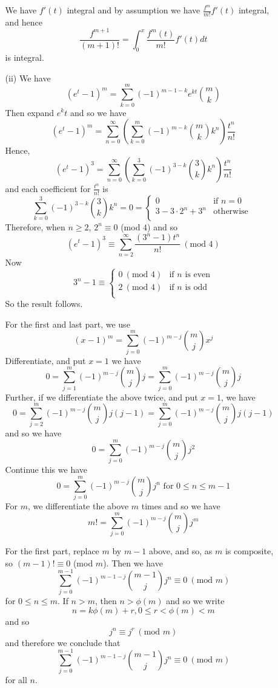 \begin{enumerate}
\begin{enumerate}
      We have $f'(t)$ integral and by assumption we have $\frac{f^m}{m!} f'(t)$ integral, and hence
      $$\frac{f^{m+1}}{(m+1)!}=\int_0^x \frac{f^{m}(t)}{m!}f'(t) dt$$ is integral.
      \item[(ii)] We have
      $$(e^t-1)^{m}=\sum_{k=0}^{m}(-1)^{m-1-k}e^{kt}\binom{m}{k}$$
      Then expand $e^kt$ and so we have
      $$(e^t-1)^{m}=\sum_{n=0}^\infty \left(\sum_{k=0}^{m} (-1)^{m-k}\binom{m}{k}k^n\right)\frac{t^n}{n!}$$
      Hence,
      $$(e^t-1)^3=\sum_{n=0}^\infty \left(\sum_{k=0}^3 (-1)^{3-k}\binom{3}{k}{k^n}\right)\frac{t^n}{n!}$$
      and each coefficient for $\frac{t^n}{n!}$ is
      \begin{equation*}
\sum_{k=0}^3 (-1)^{3-k}\binom{3}{k}{k^n}=0= \left\{
\begin{array}{ll}
0 & \text{if } n=0\\
3-3\cdot 2^n+3^n & \text{otherwise } \\
\end{array} \right.
     \end{equation*}
     Therefore, when $n \ge 2$, $2^n \equiv 0$ (mod $4$) and so
     $$(e^t-1)^3 \equiv \sum_{n=2}^\infty \frac{(3^n-1)t^n}{n!}~(\text{mod } 4)$$
     Now
      \begin{equation*}
3^n-1 \equiv \left\{
\begin{array}{ll}
0~(\text{mod } 4)& \text{if } n \text{ is even}\\
2~(\text{mod } 4) & \text{if } n \text{ is odd} \\
\end{array} \right.
     \end{equation*}
     So the result follows.

     For the first and last part, we use
     $$(x-1)^m= \sum_{j=0}^m (-1)^{m-j}\binom{m}{j}x^j$$
     Differentiate, and put $x=1$ we have
     $$0=\sum_{j=1}^m (-1)^{m-j}\binom{m}{j} j=\sum_{j=0}^m (-1)^{m-j} \binom{m}{j} j$$
     Further, if we differentiate the above twice, and put $x=1$, we have
     $$0=\sum_{j=2}^m (-1)^{m-j} \binom{m}{j} j(j-1)=\sum_{j=0}^m (-1)^{m-j} \binom{m}{j} j(j-1)$$
     and so we have
     $$0=\sum_{j=0}^m (-1)^{m-j} \binom{m}{j} j^2$$
     Continue this we have
     $$0=\sum_{j=0}^m (-1)^{m-j} \binom{m}{j} j^{n} \text{ for } 0 \le n \le m-1$$
     For $m$, we differentiate the above $m$ times and so we have
     $$m!=\sum_{j=0}^m (-1)^{m-j} \binom{m}{j} j^m$$

     For the first part, replace $m$ by $m-1$ above, and so, as $m$ is composite, so $(m-1)! \equiv 0$
     (mod $m$). Then we have
     $$\sum_{j=0}^{m-1} (-1)^{m-1-j} \binom{m-1}{j} j^n \equiv 0~(\text{mod } m)$$
     for $0 \le n \le m$. If $n>m$, then $n>\phi(m)$ and so we write
     $$n=k\phi(m)+r, 0 \le r <\phi(m) <m$$
     and so
     $$j^{n} \equiv j^r~(\text{mod } m)$$
     and therefore we conclude that
     $$\sum_{j=0}^{m-1} (-1)^{m-1-j} \binom{m-1}{j} j^n \equiv 0~(\text{mod } m)$$
     for all $n$.


\end{enumerate}
\end{enumerate}
